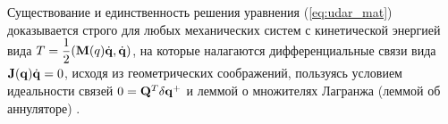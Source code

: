 Существование и единственность решения уравнения (\ref{eq:udar_mat}) доказывается строго для любых механических систем с кинетической энергией вида $T = \displaystyle\frac{\displaystyle 1}{\displaystyle 2}(\mathbf{M}(q)\dot{\mathbf{q}}, \dot{\mathbf{q}})$, на которые налагаются дифференциальные связи вида $\mathbf{J}(\mathbf{q})\dot{\mathbf{q}} = 0$, исходя из геометрических соображений, пользуясь условием идеальности связей $0 = \mathbf{Q}^T \delta\mathbf{q}^+$ и леммой о множителях Лагранжа (леммой об аннуляторе) \cite{KarapetyanKugushev2010}.




